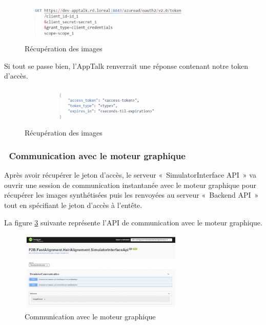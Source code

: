 \begin{figure}[!ht]\centering
\includegraphics[width=0.8\textwidth]{chapitres/chapitre4/figures/Apptalk.png}
\caption{Récupération des images}
\label{fig:git}
\end{figure}

Si tout se passe bien, l’AppTalk renverrait une réponse contenant notre token d’accès.

\begin{figure}[!ht]\centering
\includegraphics[width=0.8\textwidth]{chapitres/chapitre4/figures/Apptalk-token.png}
\caption{Récupération des images}
\label{fig:git}
\end{figure}

\subsubsection{ Communication avec le moteur graphique}
Après avoir récupérer le jeton d’accès, le serveur « SimulatorInterface API » va ouvrir une session de communication instantanée avec le moteur graphique pour récupérer les images synthétisées puis les renvoyées au serveur « Backend API » tout en spécifiant le jeton d’accès à l’entête. 

La figure \ref{fig:comMoteur} suivante représente l’API de communication avec le moteur graphique.

\begin{figure}[!ht]\centering
\includegraphics[width=0.7\textwidth]{chapitres/chapitre4/figures/SimuGet.png}
\caption{Communication avec le moteur graphique}
\label{fig:comMoteur}
\end{figure}

